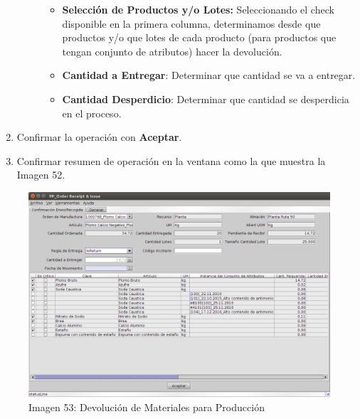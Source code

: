 \documentclass[letterpaper,10pt,spanish]{sphinxmanual}
\begin{document}
\begin{enumerate}
\begin{description}
\begin{itemize}
\item {} 
\textbf{Selección de Productos y/o Lotes:} Seleccionando el check disponible en la primera columna, determinamos desde que productos y/o que lotes de cada producto (para productos que tengan conjunto de atributos) hacer la devolución.

\item {} 
\textbf{Cantidad a Entregar}: Determinar que cantidad se va a entregar.

\item {} 
\textbf{Cantidad Desperdicio}: Determinar que cantidad se desperdicia en el proceso.

\end{itemize}

\end{description}

\item {} 
Confirmar la operación con \textbf{Aceptar}.

\item {} 
Confirmar resumen de operación en la ventana como la que muestra la Imagen 52.

\end{enumerate}
\begin{figure}[htbp]
\centering
\capstart

\includegraphics{ly_devolucion.png}
\caption{Imagen 53: Devolución de Materiales para Producción}\end{figure}
\end{document}
